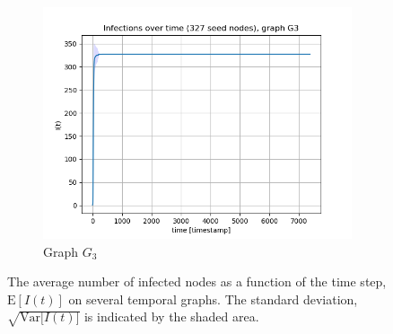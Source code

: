 \documentclass[letterpaper]{article}
\begin{document}
\begin{figure}
\begin{subfigure}[b]{0.32\textwidth}
        \includegraphics[width=\textwidth]{img/infections_G3.png}
        \caption{Graph \(G_3\)}
	    \label{fig:infections_over_time_G3}
    \end{subfigure}
    \caption{\small{The average number of infected nodes as a function of the time step, $\mathrm{E}[I(t)]$ on several temporal graphs. The standard deviation, $\sqrt{\mathrm{Var}{[I(t)}]}$ is indicated by the shaded area.}}
    \label{fig:infections_over_time}
	
	\bigskip
	

\end{figure}
\end{document}
